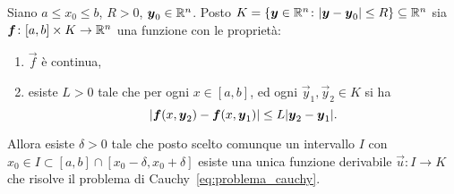\begin{theorem}%
  \label{th:cauchy_lipschitz}%
Siano $a\le x_0 \le b$, $R>0$, $\boldsymbol y_0 \in {\mathbb R}^n$. 
Posto $K={\left\{ \boldsymbol y\in {\mathbb R}^n \colon {\left|\boldsymbol y - \boldsymbol y_0\right|}\le R \right\}}\subseteq {\mathbb R}^n$ 
sia $\boldsymbol f\colon [a,b]\times K\to {\mathbb R}^n$ una funzione con le proprietà:
\begin{enumerate}
  \item $\vec f$ è continua,
  \item esiste $L>0$ tale che per ogni $x\in [a,b]$, ed ogni $\vec y_1,\vec y_2 \in K$ 
  si ha 
  \begin{equation}\label{eq:hp_lipschitz}
  {\left|\boldsymbol f(x, \boldsymbol y_2) - \boldsymbol f(x,\boldsymbol y_1)\right|} \le L {\left|\boldsymbol y_2- \boldsymbol y_1\right|}.  
  \end{equation}
\end{enumerate}

Allora esiste $\delta>0$ tale che posto 
scelto comunque un intervallo $I$ con 
$x_0 \in I \subset [a,b]\cap [x_0-\delta, x_0+\delta]$ 
esiste una unica funzione derivabile $\vec u\colon I \to K$ 
che risolve il problema di Cauchy~\eqref{eq:problema_cauchy}.
\end{theorem}
%
